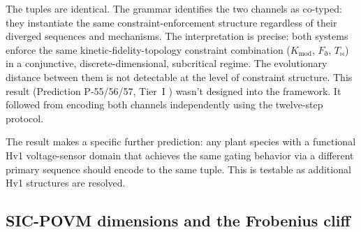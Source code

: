 \documentclass[12pt,a4paper]{article}
\newcommand{\Tbw}{T_{\mathord{\bowtie}}}
\begin{document}
The tuples are identical. The grammar identifies the two channels
as co-typed: they instantiate the same constraint-enforcement
structure regardless of their diverged sequences and mechanisms.
The interpretation is precise: both systems enforce the same
kinetic-fidelity-topology constraint combination ($K_\text{mod}$,
$F_\eth$, $\Tbw$) in a conjunctive, discrete-dimensional,
subcritical regime. The evolutionary distance between them is not
detectable at the level of constraint structure. This result
(Prediction P-55/56/57, Tier~I \cite{ramsey2006}) wasn't designed
into the framework. It followed from encoding both channels
independently using the twelve-step protocol.

The result makes a specific further prediction: any plant species
with a functional Hv1 voltage-sensor domain that achieves the
same gating behavior via a different primary sequence should
encode to the same tuple. This is testable as additional Hv1
structures are resolved.

\subsection{SIC-POVM dimensions and the Frobenius cliff}
\label{sec:sic}
\end{document}

